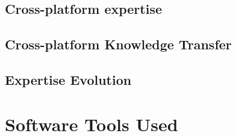         
    \subsection{Cross-platform expertise}
    \subsection{Cross-platform Knowledge Transfer}
    \subsection{Expertise Evolution}

\section{Software Tools Used}



    
